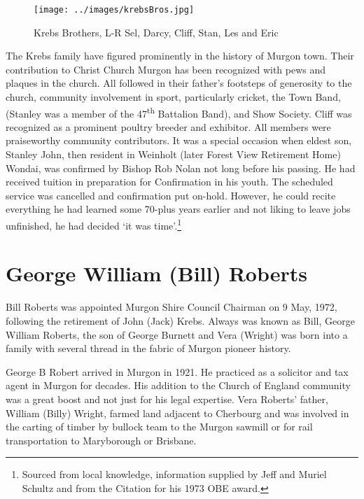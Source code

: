 \begin{figure}
\begin{center}
\texttt{[image: ../images/krebsBros.jpg]}
\caption{Krebs Brothers, L-R Sel, Darcy, Cliff, Stan, Les and Eric}
\end{center}
\end{figure}




The Krebs family have figured prominently in the history of Murgon town. Their contribution to Christ Church Murgon has been recognized with pews and plaques in the church. All followed in their father's footsteps of generosity to the church, community involvement in sport, particularly cricket, the Town Band, (Stanley was a member of the 47\textsuperscript{th} Battalion Band), and Show Society. Cliff was recognized as a prominent poultry breeder and exhibitor. All members were praiseworthy community contributors. It was a special occasion when eldest son, Stanley John, then resident in Weinholt (later Forest View Retirement Home) Wondai, was confirmed by Bishop Rob Nolan not long before his passing. He had received tuition in preparation for Confirmation in his youth. The scheduled service was cancelled and confirmation put on-hold. However, he could recite everything he had learned some 70-plus years earlier and not liking to leave jobs unfinished, he had decided `it was time'.\footnote{Sourced from local knowledge, information supplied by Jeff and Muriel Schultz and from the Citation for his 1973 OBE award.}


\section{George William (Bill) Roberts}



Bill Roberts was appointed Murgon Shire Council Chairman on 9 May, 1972, following the retirement of John (Jack) Krebs. Always was known as Bill, George William Roberts, the son of George Burnett and Vera (Wright) was born into a family with several thread in the fabric of Murgon pioneer history.



George B Robert arrived in Murgon in 1921. He practiced as a solicitor and tax agent in Murgon for decades. His addition to the Church of England community was a great boost and not just for his legal expertise. Vera Roberts' father, William (Billy) Wright, farmed land adjacent to Cherbourg and was involved in the carting of timber by bullock team to the Murgon sawmill or for rail transportation to Maryborough or Brisbane.



